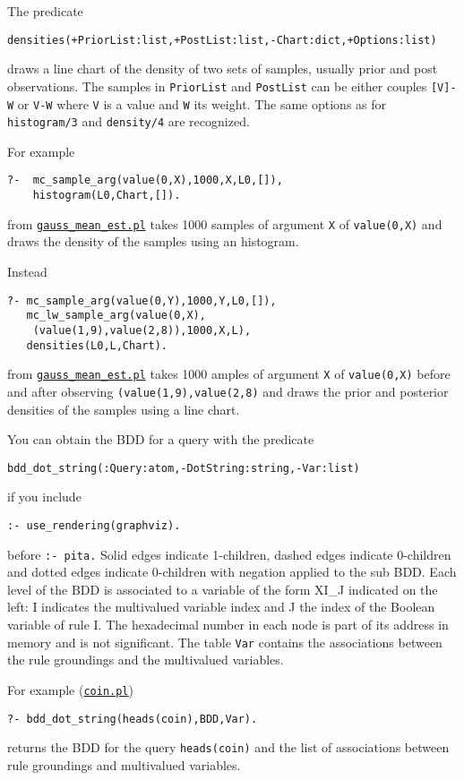 The predicate
\begin{verbatim}
densities(+PriorList:list,+PostList:list,-Chart:dict,+Options:list)
\end{verbatim}
draws a line chart of the density of two sets of samples, usually
 prior and post observations. The samples in \verb|PriorList| and \verb|PostList|
can be either couples \verb|[V]-W| or \verb|V-W| where \verb|V| is a value and \verb|W| its weight.
The same options as for \verb|histogram/3| and  \verb|density/4|  are recognized.

For example
\begin{verbatim}
?-  mc_sample_arg(value(0,X),1000,X,L0,[]),
    histogram(L0,Chart,[]).
\end{verbatim}
from \href{http://cplint.eu/example/inference/gauss_mean_est.pl}{\texttt{gauss\_mean\_est.pl}}
takes 1000 samples of argument \verb|X| of \verb|value(0,X)| and draws the density of the samples using an histogram.

Instead
\begin{verbatim}
?- mc_sample_arg(value(0,Y),1000,Y,L0,[]),
   mc_lw_sample_arg(value(0,X),
    (value(1,9),value(2,8)),1000,X,L),
   densities(L0,L,Chart).
\end{verbatim}
from \href{http://cplint.eu/example/inference/gauss_mean_est.pl}{\texttt{gauss\_mean\_est.pl}}
takes 1000 amples of argument \verb|X| of \verb|value(0,X)| before and after observing
\verb|(value(1,9),value(2,8)| and draws the prior and posterior densities of the samples using a line chart.

You can obtain the BDD for a query with the predicate
\begin{verbatim}
bdd_dot_string(:Query:atom,-DotString:string,-Var:list)
\end{verbatim}
if you include
\begin{verbatim}
:- use_rendering(graphviz).
\end{verbatim}
before \verb|:- pita.|
Solid edges indicate 1-children, dashed edges indicate 0-children and dotted
edges indicate 0-children with negation applied to the sub BDD.
Each level of the BDD is associated to a variable of the form XI\_J indicated on the left:
I indicates the  multivalued variable index and J the index of the Boolean variable of rule I.
The hexadecimal number in each node is part of its address in memory and is not significant.
The table \verb|Var| contains the associations between the rule groundings and the
multivalued variables.

For example (\href{http://cplint.eu/example/inference/coin.pl}{\texttt{coin.pl}})
\begin{verbatim}
?- bdd_dot_string(heads(coin),BDD,Var).
\end{verbatim}
returns the BDD for the query \verb|heads(coin)| and the list of associations between rule groundings and
multivalued variables.

